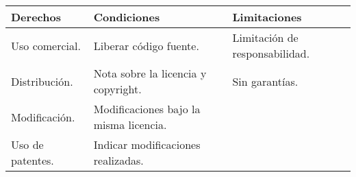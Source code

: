 \begin{longtable}[]{@{}lll@{}}
\toprule
\begin{minipage}[b]{0.19\columnwidth}\raggedright\strut
Derechos\strut
\end{minipage} & \begin{minipage}[b]{0.40\columnwidth}\raggedright\strut
Condiciones\strut
\end{minipage} & \begin{minipage}[b]{0.32\columnwidth}\raggedright\strut
Limitaciones\strut
\end{minipage}\tabularnewline
\midrule
\endhead
\begin{minipage}[t]{0.19\columnwidth}\raggedright\strut
Uso comercial.\strut
\end{minipage} & \begin{minipage}[t]{0.40\columnwidth}\raggedright\strut
Liberar código fuente.\strut
\end{minipage} & \begin{minipage}[t]{0.32\columnwidth}\raggedright\strut
Limitación de responsabilidad.\strut
\end{minipage}\tabularnewline
\begin{minipage}[t]{0.19\columnwidth}\raggedright\strut
Distribución.\strut
\end{minipage} & \begin{minipage}[t]{0.40\columnwidth}\raggedright\strut
Nota sobre la licencia y copyright.\strut
\end{minipage} & \begin{minipage}[t]{0.32\columnwidth}\raggedright\strut
Sin garantías.\strut
\end{minipage}\tabularnewline
\begin{minipage}[t]{0.19\columnwidth}\raggedright\strut
Modificación.\strut
\end{minipage} & \begin{minipage}[t]{0.40\columnwidth}\raggedright\strut
Modificaciones bajo la misma licencia.\strut
\end{minipage} & \begin{minipage}[t]{0.32\columnwidth}\raggedright\strut
\strut
\end{minipage}\tabularnewline
\begin{minipage}[t]{0.19\columnwidth}\raggedright\strut
Uso de patentes.\strut
\end{minipage} & \begin{minipage}[t]{0.40\columnwidth}\raggedright\strut
Indicar modificaciones realizadas.\strut
\end{minipage} & \begin{minipage}[t]{0.32\columnwidth}\raggedright\strut

\end{minipage}
\end{longtable}
